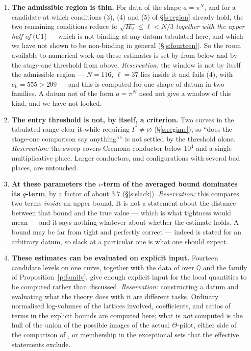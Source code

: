 \documentclass[11pt]{article}
\theoremstyle{plain}
\theoremstyle{definition}
\begin{document}
\begin{enumerate}[label=(R\arabic*),leftmargin=*]
\item \textbf{The admissible region is thin.}  For data of the shape $a=\pi^N$, and
for a candidate at which conditions (3), (4) and (5) of \S\ref{s:region} already hold,
the two remaining conditions reduce to $\sqrt{H_\forall}\le\ell<N/3$ \emph{together
with the upper half of} (C1) --- which is not binding at any datum tabulated here, and
which we have not shown to be non-binding in general (\S\ref{s:fourteen}).  So the room
available to numerical work on these estimates is set by \cite[Cor.~2.2(ii)]{IUT4} from
below and by the stage-one threshold from above.
\emph{Reservation:} the window is not by itself the admissible region --- $N=116$,
$\ell=37$ lies inside it and fails (4), with $e_{\mathrm b}=555>209$ --- and this is
computed for one shape of datum in two families.  A datum not of the form $a=\pi^N$
need not give a window of this kind, and we have not looked.

\item \textbf{The entry threshold is not, by itself, a criterion.}  Two curves in the
tabulated range clear it while requiring $I^{*}\ne\varnothing$ (\S\ref{s:regime}), so
``does the stage-one comparison say anything?'' is not settled by the threshold alone.
\emph{Reservation:} the sweep covers Cremona conductor below $10^4$ and a single
multiplicative place.  Larger conductors, and configurations with several bad places,
are untouched.

\item \textbf{At these parameters the $\iota$-term of the averaged bound dominates its
$q$-term}, by a factor of about $3.7$ (\S\ref{s:slack}).  \emph{Reservation:} this compares two terms \emph{inside} an
upper bound.  It is not a statement about the distance between that bound and the true
value --- which is what tightness would mean --- and it says nothing whatever about
whether the estimate holds.  A bound may be far from tight
and perfectly correct --- indeed \cite[Thm.~1.10]{IUT4} is stated for an arbitrary
datum, so slack at a particular one is what one should expect.

\item \textbf{These estimates can be evaluated on explicit input.}  Fourteen
candidate levels on one curve, together with the data of \cite{DH25} over $\mathbb{Q}$ and the family of
Proposition~\ref{p:family}, give enough explicit input for the local quantities to be
computed rather than discussed.  \emph{Reservation:} constructing a datum and
evaluating what the theory does with it are different tasks.  Ordinary normalised
log-volumes of the lattices involved, coefficients, and ratios of terms in the explicit
bounds are computed here; what is \emph{not} computed is the hull of the union of the
possible images of the actual $\Theta$-pilot, either side of the comparison of
\cite[Cor.~3.12]{IUT3}, or membership in the exceptional sets that the effective
statements exclude.
\end{enumerate}
\end{document}
